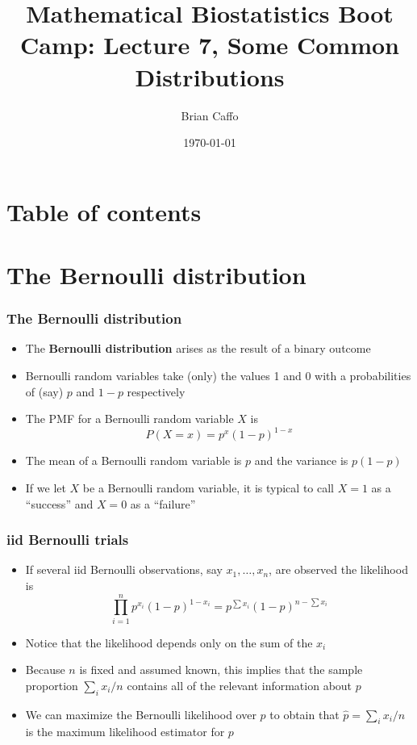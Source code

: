 \documentclass[aspectratio=169]{beamer}
\title{Mathematical Biostatistics Boot Camp: Lecture 7, Some Common Distributions}
\author{Brian Caffo}
\date{\today}
\institute[Department of Biostatistics]{
  Department of Biostatistics \\
  Johns Hopkins Bloomberg School of Public Health\\
  Johns Hopkins University
}
\begin{document}
\frame{\titlepage}


\section{Table of contents}


\section{The Bernoulli distribution}
\begin{frame}\frametitle{The Bernoulli distribution}
\begin{itemize}
\item The {\bf Bernoulli distribution} arises as the result of a
  binary outcome
\item Bernoulli random variables take (only) the values 1 and 0 with a
  probabilities of (say) $p$ and $1-p$ respectively
\item The PMF for a Bernoulli random variable $X$ is
  $$P(X = x) =  p^x (1 - p)^{1 - x}$$
\item The mean of a Bernoulli random variable is $p$ and the variance
  is $p(1 - p)$
\item If we let $X$ be a Bernoulli random variable, it is typical to
  call $X=1$ as a ``success'' and $X=0$ as a ``failure''
\end{itemize}
\end{frame}


\begin{frame}\frametitle{iid Bernoulli trials}
\begin{itemize}
\item If several iid Bernoulli observations, say $x_1,\ldots, x_n$, are observed the
likelihood is 
$$
  \prod_{i=1}^n p^{x_i} (1 - p)^{1 - x_i} = p^{\sum x_i} (1 - p)^{n - \sum x_i}
$$
\item Notice that the likelihood depends only on the sum of the $x_i$
\item Because $n$ is fixed and assumed known, this implies that the
  sample proportion $\sum_i x_i / n$ contains all of the relevant
  information about $p$
\item We can maximize the Bernoulli likelihood over $p$ to obtain that
$\hat p = \sum_i x_i / n$ is the maximum likelihood estimator for $p$
\end{itemize}
\end{frame}
\end{document}
